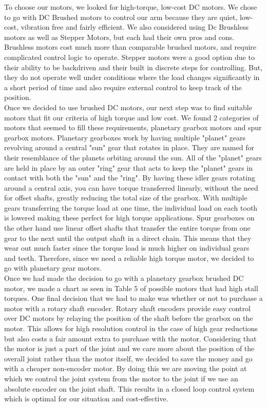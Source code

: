 To choose our motors, we looked for high-torque, low-cost DC motors. We chose to go with DC Brushed motors to control our arm because they are quiet, low-cost, vibration free and fairly efficient. We also considered using Dc Brushless motors as well as Stepper Motors, but each had their own pros and cons. Brushless motors cost much more than comparable brushed motors, and require complicated control logic to operate. Stepper motors were a good option due to their ability to be backdriven and their built in discrete steps for controlling. But, they do not operate well under conditions where the load changes significantly in a short period of time and also require external control to keep track of the position.  \\
\newline
Once we decided to use brushed DC motors, our next step was to find suitable motors that fit our criteria of high torque and low cost. We found 2 categories of motors that seemed to fill these requirements, planetary gearbox motors and spur gearbox motors. Planetary gearboxes work by having multiple "planet" gears revolving around a central "sun" gear that rotates in place. They are named for their resemblance of the planets orbiting around the sun. All of the "planet" gears are held in place by an outer "ring" gear that acts to keep the "planet" gears in contact with both the "sun" and the "ring". By having these idler gears rotating around a central axis, you can have torque transferred linearly, without the need for offset shafts, greatly reducing the total size of the gearbox. With multiple gears transferring the torque load at one time, the individual load on each tooth is lowered making these perfect for high torque applications. Spur gearboxes on the other hand use linear offset shafts that transfer the entire torque from one gear to the next until the output shaft in a direct chain.  This means that they wear out much faster since the torque load is much higher on individual gears and teeth.  Therefore, since we need a reliable high torque motor, we decided to go with planetary gear motors.  \\
\newline
Once we had made the decision to go with a planetary gearbox brushed DC motor, we made a chart as seen in Table 5 of possible motors that had high stall torques.  One final decision that we had to make was whether or not to purchase a motor with a rotary shaft encoder. Rotary shaft encoders provide easy control over DC motors by relaying the position of the shaft before the gearbox on the motor.  This allows for high resolution control in the case of high gear reductions but also costs a fair amount extra to purchase with the motor.  Considering that the motor is just a part of the joint and we care more about the position of the overall joint rather than the motor itself, we decided to save the money and go with a cheaper non-encoder motor.  By doing this we are moving the point at which we control the joint system from the motor to the joint if we use an absolute encoder on the joint shaft.  This results in a closed loop control system which is optimal for our situation and cost-effective.  

